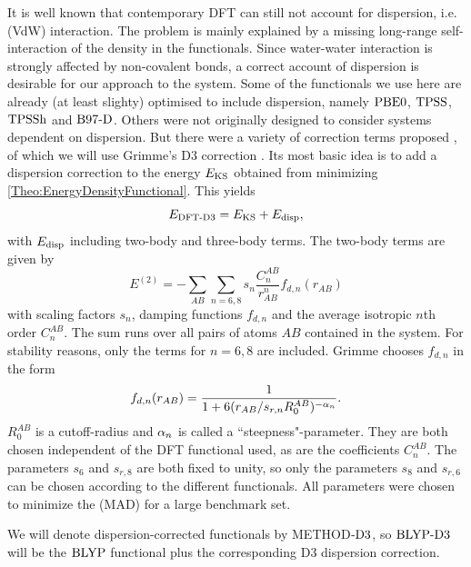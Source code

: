 \documentclass[8.5pt,twoside,twocolumn]{article}
\theoremstyle{standard}
\begin{document}
It is well known that contemporary DFT can still not account for dispersion, i.e.  (VdW)
interaction. 
The problem is mainly explained by a missing long-range self-interaction
of the density \cite{Kryachko} in the functionals.
Since water-water interaction is strongly affected by non-covalent bonds, a correct
account of dispersion is desirable for our approach to the system. Some of the functionals
we use here are already (at least slighty) optimised to include dispersion, namely
$\text{PBE0}$, $\text{TPSS}$, $\text{TPSSh}$ and $\text{B97-D}$. Others were not originally designed to
consider systems dependent on dispersion. But there were a variety of correction
terms proposed \cite{BeckeXDM2007}\cite{GrimmeDCorrection2010}, of which we will use
Grimme's D3 correction \cite{GrimmeD32011}. Its most basic idea is to add a dispersion
correction to the energy $E_{\text{KS}}$ obtained from minimizing \eqref{Theo:EnergyDensityFunctional}.
This yields
\begin{equation}
E_{\text{DFT-D3}}=E_{\text{KS}}+E_{\text{disp}},
\end{equation}  
with $E_{\text{disp}}$ including two-body and three-body terms. The two-body terms
are given by
\begin{equation}
E^{(2)}=-\sum_{AB}\sum_{n=6,8} s_n \frac {C_n^{AB}}{r_{AB}^n} f_{d,n}(r_{AB})
\end{equation}
with scaling factors $s_n$, damping functions $f_{d,n}$ and the average isotropic
$n$th order  $C_n^{AB}$. The sum runs over
all pairs of atoms $AB$ contained in the system. For stability reasons, only the terms
for $n=6,8$ are included. 
Grimme chooses $f_{d,n}$ in the form
\begin{equation}
f_{d,n}(r_{AB})=\frac 1 {1+6(r_{AB}/s_{r,n}R_0^{AB})^{-\alpha_n}}.
\end{equation}
$R_0^{AB}$ is a cutoff-radius and $\alpha_n$ is called a ``steepness"-parameter. They are both
chosen independent of the DFT functional used, as are the coefficients $C_n^{AB}$. The
parameters $s_6$ and $s_{r,8}$ are both fixed to unity, so only the parameters
$s_8$ and $s_{r,6}$ can be chosen according to the different functionals. All
parameters were chosen to minimize the  (MAD) for
a large benchmark set.

We will denote dispersion-corrected functionals by METHOD$\text{-D3}$, so $\text{BLYP}\text{-D3}$
will be the $\text{BLYP}$ functional plus the corresponding D3 dispersion correction.
\end{document}
